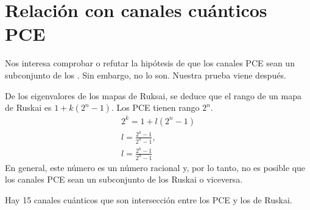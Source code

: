 \section{Relación con canales cuánticos PCE}

Nos interesa comprobar o refutar la hipótesis de que los canales PCE sean 
un subconjunto de los \ruskai. Sin embargo, no lo son. Nuestra prueba 
viene después. 

De los eigenvalores de los mapas de Ruksai, se deduce que el rango de un 
mapa de Ruskai es $1+k(2^n-1)$. Los PCE tienen rango $2^n$.
\begin{align}
2^k=1+l(2^n-1)\\
l=\frac{2^k-1}{2^n-1},\\
l=\frac{2^k-1}{2^n-1}
\end{align}
En general, este número es un número racional y, por lo tanto, no es 
posible que los canales PCE sean un subconjunto de los Ruskai o viceversa.

Hay 15 canales cuánticos que son intersección entre los PCE y los de Ruskai.

